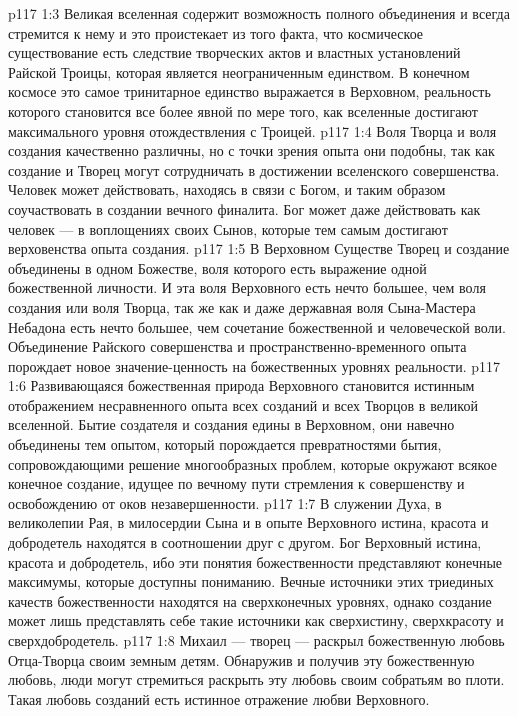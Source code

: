 \vs p117 1:3 Великая вселенная содержит возможность полного объединения и всегда стремится к нему и это проистекает из того факта, что космическое существование есть следствие творческих актов и властных установлений Райской Троицы, которая является неограниченным единством. В конечном космосе это самое тринитарное единство выражается в Верховном, реальность которого становится все более явной по мере того, как вселенные достигают максимального уровня отождествления с Троицей.
\vs p117 1:4 \pc Воля Творца и воля создания качественно различны, но с точки зрения опыта они подобны, так как создание и Творец могут сотрудничать в достижении вселенского совершенства. Человек может действовать, находясь в связи с Богом, и таким образом соучаствовать в создании вечного финалита. Бог может даже действовать как человек --- в воплощениях своих Сынов, которые тем самым достигают верховенства опыта создания.
\vs p117 1:5 В Верховном Существе Творец и создание объединены в одном Божестве, воля которого есть выражение одной божественной личности. И эта воля Верховного есть нечто большее, чем воля создания или воля Творца, так же как и даже державная воля Сына\hyp{}Мастера Небадона есть нечто большее, чем сочетание божественной и человеческой воли. Объединение Райского совершенства и пространственно\hyp{}временного опыта порождает новое значение\hyp{}ценность на божественных уровнях реальности.
\vs p117 1:6 Развивающаяся божественная природа Верховного становится истинным отображением несравненного опыта всех созданий и всех Творцов в великой вселенной. Бытие создателя и создания едины в Верховном, они навечно объединены тем опытом, который порождается превратностями бытия, сопровождающими решение многообразных проблем, которые окружают всякое конечное создание, идущее по вечному пути стремления к совершенству и освобождению от оков незавершенности.
\vs p117 1:7 \pc В служении Духа, в великолепии Рая, в милосердии Сына и в опыте Верховного истина, красота и добродетель находятся в соотношении друг с другом. Бог Верховный  истина, красота и добродетель, ибо эти понятия божественности представляют конечные максимумы, которые доступны пониманию. Вечные источники этих триединых качеств божественности находятся на сверхконечных уровнях, однако создание может лишь представлять себе такие источники как сверхистину, сверхкрасоту и сверхдобродетель.
\vs p117 1:8 Михаил --- творец --- раскрыл божественную любовь Отца\hyp{}Творца своим земным детям. Обнаружив и получив эту божественную любовь, люди могут стремиться раскрыть эту любовь своим собратьям во плоти. Такая любовь созданий есть истинное отражение любви Верховного.

